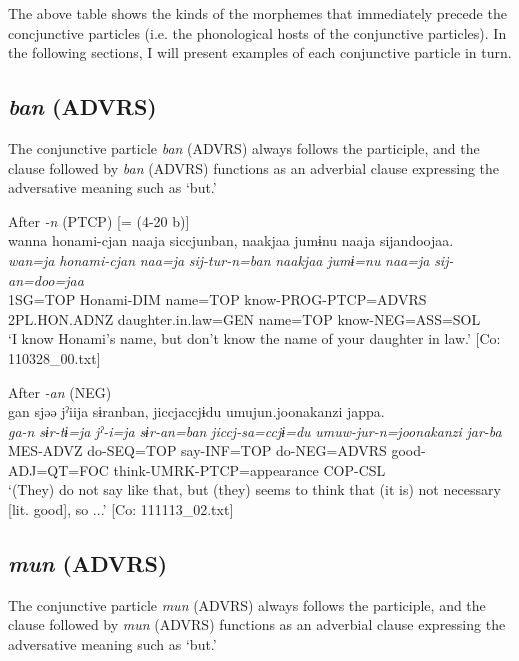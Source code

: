 The above table shows the kinds of the morphemes that immediately precede the concjunctive particles (i.e. the phonological hosts of the conjunctive particles). In the following sections, I will present examples of each conjunctive particle in turn.

\subsection{\textit{ban} (ADVRS)}\label{sec:10.2.1}

The conjunctive particle \textit{ban} (ADVRS) always follows the participle, and the clause followed by \textit{ban} (ADVRS) functions as an adverbial clause expressing the adversative meaning such as ‘but.’

\ea\label{ex:10.30} 
\ea After \textit{-n} (PTCP) [= (4-20 b)]\\
      \glll    wanna  honami-{\textbar}cjan{\textbar}  naaja  siccjunban, naakjaa  jumɨnu  naaja  sijandoojaa.\\
    \textit{wan=ja}  \textit{honami-cjan}  \textit{naa=ja}  \textit{sij-tur-n=ban}  \textit{naakjaa}  \textit{jumɨ=nu}  \textit{naa=ja}  \textit{sij-an=doo=jaa}\\
    1SG=TOP  Honami-DIM  name=TOP  know-PROG-PTCP=ADVRS  2PL.HON.ADNZ  daughter.in.law=GEN  name=TOP  know-NEG=ASS=SOL\\
\glt     ‘I know Honami’s name, but don’t know the name of your daughter in law.’  [Co: 110328\_00.txt]

  \ex After \textit{-an} (NEG)\\
      \glll    gan  sjəə  jˀiija  sɨranban,  jiccjaccjɨdu  umujun.{\textbar}joonakanzi{\textbar}  jappa.\\
    \textit{ga-n}  \textit{sɨr-tɨ=ja}  \textit{jˀ-i=ja}  \textit{sɨr-an=ban}     \textit{jiccj-sa=ccjɨ=du}  \textit{umuw-jur-n=joonakanzi}  \textit{jar-ba}\\
    MES-ADVZ  do-SEQ=TOP  say-INF=TOP  do-NEG=ADVRS  good-ADJ=QT=FOC  think-UMRK-PTCP=appearance  COP-CSL\\
\glt     ‘(They) do not say like that, but (they) seems to think that (it is) not necessary [lit. good], so ...’  [Co: 111113\_02.txt]
\z
\z

\subsection{\textit{mun} (ADVRS)}\label{sec:10.2.2}

The conjunctive particle \textit{mun} (ADVRS) always follows the participle, and the clause followed by \textit{mun} (ADVRS) functions as an adverbial clause expressing the adversative meaning such as ‘but.’

